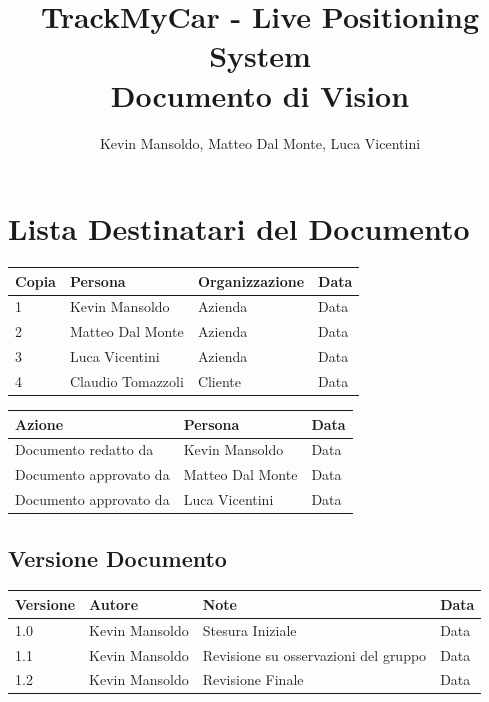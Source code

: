 \documentclass[a4paper,12pt]{article}
\begin{document}
\title{\textbf{TrackMyCar - Live Positioning System} \\ Documento di Vision}

\author{Kevin Mansoldo, Matteo Dal Monte, Luca Vicentini}
\maketitle
\pagebreak

\tableofcontents
\pagebreak

\section{Lista Destinatari del Documento}

\begin{table}[ht]
\begin{center}
\begin{tabular}{p{1cm} p{4.5cm} p{5cm} p{2cm}}
\rowcolor{Ash}
\hline
Copia & Persona & Organizzazione & Data \\ \hline
1 & Kevin Mansoldo & Azienda & Data \\ 
2 & Matteo Dal Monte & Azienda & Data \\ 
3 & Luca Vicentini & Azienda & Data \\ 
4 & Claudio Tomazzoli & Cliente & Data \\ \hline
\end{tabular}
\end{center}


\begin{center}
\begin{tabular}{p{6cm} p{5cm} p{2cm}}
\rowcolor{Ash}
\hline
Azione & Persona & Data \\ \hline
Documento redatto da & Kevin Mansoldo & Data \\ 
Documento approvato da & Matteo Dal Monte & Data \\ 
Documento approvato da & Luca Vicentini & Data \\ \hline
\end{tabular}
\end{center}
\end{table}

\subsection{Versione Documento}
\begin{table}[ht]
\begin{center}
\begin{tabular}{p{1cm} p{4.5cm} p{5cm} p{2cm}}
\rowcolor{Ash}
\hline
Versione & Autore & Note & Data \\ \hline
1.0 & Kevin Mansoldo & Stesura Iniziale & Data \\ 
1.1 & Kevin Mansoldo & Revisione su osservazioni del gruppo & Data \\ 
1.2 & Kevin Mansoldo & Revisione Finale & Data \\ \hline
\end{tabular}
\end{center}
\end{table}
\end{document}
